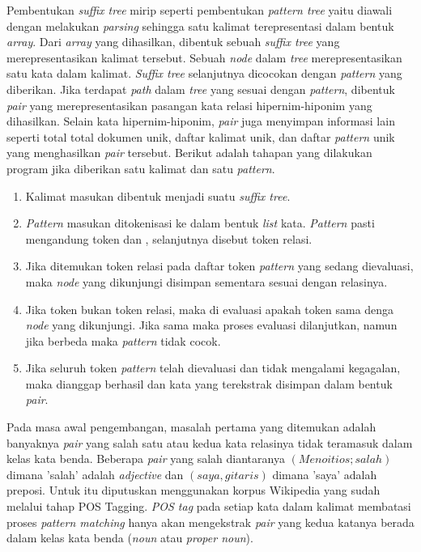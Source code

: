 Pembentukan \textit{suffix tree} mirip seperti pembentukan \textit{pattern tree} yaitu diawali dengan melakukan \textit{parsing} sehingga satu kalimat terepresentasi dalam bentuk \textit{array}. Dari \textit{array} yang dihasilkan, dibentuk sebuah \textit{suffix tree} yang merepresentasikan kalimat tersebut. Sebuah \textit{node} dalam \textit{tree} merepresentasikan satu kata dalam kalimat. \textit{Suffix tree} selanjutnya dicocokan dengan \textit{pattern} yang diberikan. Jika terdapat \textit{path} dalam \textit{tree} yang sesuai dengan \textit{pattern}, dibentuk \textit{pair} yang merepresentasikan pasangan kata relasi hipernim-hiponim yang dihasilkan. Selain kata hipernim-hiponim, \textit{pair} juga menyimpan informasi lain seperti total total dokumen unik, daftar kalimat unik, dan daftar \textit{pattern} unik yang menghasilkan \textit{pair} tersebut. Berikut adalah tahapan yang dilakukan program jika diberikan satu kalimat dan satu \textit{pattern}.

\begin{enumerate}
  \item Kalimat masukan dibentuk menjadi suatu \textit{suffix tree}.
  \item \textit{Pattern} masukan ditokenisasi ke dalam bentuk \textit{list} 
  kata. \textit{Pattern} pasti mengandung token {\tagHypernym} dan {\tagHyponym}, selanjutnya disebut token relasi.
  \item Jika ditemukan token relasi pada daftar token \textit{pattern} yang sedang dievaluasi, maka \textit{node} yang dikunjungi disimpan sementara sesuai dengan relasinya.
  \item Jika token bukan token relasi, maka di evaluasi apakah token sama denga  \textit{node} yang dikunjungi. Jika sama maka proses evaluasi dilanjutkan, namun jika berbeda maka \textit{pattern} tidak cocok.
  \item Jika seluruh token \textit{pattern} telah dievaluasi dan tidak mengalami kegagalan, maka dianggap berhasil dan kata yang terekstrak disimpan dalam bentuk \textit{pair}.
\end{enumerate}

Pada masa awal pengembangan, masalah pertama yang ditemukan adalah banyaknya \textit{pair} yang salah satu atau kedua kata relasinya tidak teramasuk dalam kelas kata benda. Beberapa \textit{pair} yang salah diantaranya $(Menoitios;salah)$ dimana 'salah' adalah \textit{adjective} dan $(saya,gitaris)$ dimana 'saya' adalah preposi. Untuk itu diputuskan menggunakan korpus Wikipedia yang sudah melalui tahap POS Tagging. \textit{POS tag} pada setiap kata dalam kalimat membatasi proses \textit{pattern matching} hanya akan mengekstrak \textit{pair} yang kedua katanya berada dalam kelas kata benda (\textit{noun} atau \textit{proper noun}). 

